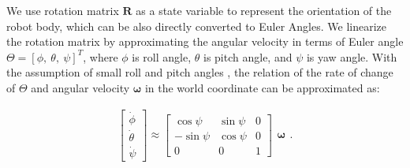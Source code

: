 We use rotation matrix $\bm R$ as a state variable to represent the orientation of the robot body, which can be also directly converted to Euler Angles. 
We linearize the rotation matrix by approximating the angular velocity in terms of Euler angle $ {\Theta = [\phi,\:\theta,\:\psi]}^T$, where $\phi$ is roll angle,  $ \theta$ is pitch angle, and $ \psi$ is yaw angle. With the assumption of small roll and pitch angles  \cite{di2018dynamic}, the relation of the rate of change of $\Theta$ and angular velocity $\bm \omega$ in the world coordinate can be approximated as: 


\begin{align}
\label{eq:omega2}
\begin{bmatrix} {\dot{\phi}} \\ {\dot{\theta}} \\ {\dot{\psi}}\end{bmatrix} \approx \left[\begin{array}{ccc} { \cos{\psi}}& {\sin{\psi}} & 0 \\{ -\sin{\psi}} & {\cos{\psi}} & 0 \\ 0 & 0 & 1\end{array} 
\right ] 
\begin{array}{cc}
     {\bm \omega}
\end{array}.
\end{align} 

